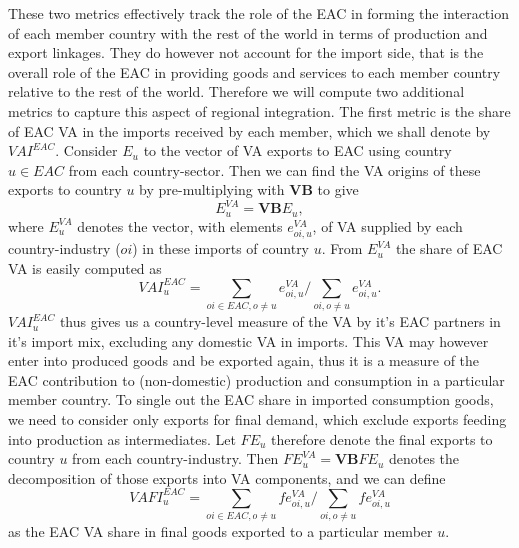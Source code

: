 \documentclass[a4paper]{article}
\begin{document}
These two metrics effectively track the role of the EAC in forming the interaction of each member country with the rest of the world in terms of production and export linkages. They do however not account for the import side, that is the overall role of the EAC in providing goods and services to each member country relative to the rest of the world. Therefore we will compute two additional metrics to capture this aspect of regional integration. The first metric is the share of EAC VA in the imports received by each member, which we shall denote by $VAI^{EAC}$. Consider $E_u$ to the vector of VA exports to EAC using country $u \in EAC$ from each country-sector.%
Then we can find the VA origins of these exports to country $u$ by pre-multiplying with \textbf{VB} to give 
\begin{equation}
E_u^{VA} = \textbf{VB}E_u,
\end{equation}
 where $E_u^{VA}$ denotes the vector, with elements $e_{oi, u}^{VA}$, of VA supplied by each country-industry ($oi$) in these imports of country $u$. From  $E_u^{VA}$ the share of EAC VA is easily computed as 
\begin{equation}
VAI_{u}^{EAC} = \sum_{oi \in EAC, o \neq u}  e_{oi, u}^{VA}  \bigg/ \sum_{oi, o \neq u}  e_{oi, u}^{VA}.  
\end{equation}
$VAI_u^{EAC}$ thus gives us a country-level measure of the VA by it's EAC partners in it's import mix, excluding any domestic VA in imports. This VA may however enter into produced goods and be exported again, thus it is a measure of the EAC contribution to (non-domestic) production and consumption in a particular member country. To single out the EAC share in imported consumption goods, we need to consider only exports for final demand, which exclude exports feeding into production as intermediates. Let $FE_u$ therefore denote the final exports to country $u$ from each country-industry. Then $FE_u^{VA} = \textbf{VB}FE_u$ denotes the decomposition of those exports into VA components, and we can define 
\begin{equation}
VAFI_{u}^{EAC} = \sum_{oi \in EAC, o \neq u}  fe_{oi, u}^{VA}  \bigg/ \sum_{oi, o \neq u}  fe_{oi, u}^{VA}
\end{equation}
as the EAC VA share in final goods exported to a particular member $u$.
\end{document}
